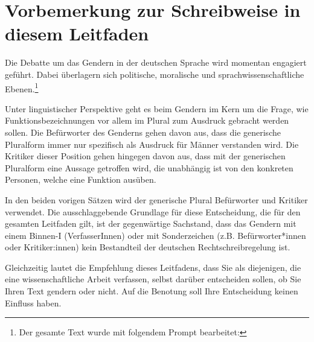 \chapter*{Vorbemerkung zur Schreibweise in diesem Leitfaden}
\label{chap:vorbemerkung}

Die Debatte um das Gendern in der deutschen Sprache wird momentan engagiert geführt. Dabei überlagern sich politische, moralische und sprachwissenschaftliche Ebenen.\footnote{Der gesamte Text wurde mit folgendem Prompt bearbeitet: }

Unter linguistischer Perspektive geht es beim Gendern im Kern um die Frage, wie Funktionsbezeichnungen vor allem im Plural zum Ausdruck gebracht werden sollen. Die Befürworter des Genderns gehen davon aus, dass die generische Pluralform immer nur spezifisch als Ausdruck für Männer verstanden wird. Die Kritiker dieser Position gehen hingegen davon aus, dass mit der generischen Pluralform eine Aussage getroffen wird, die unabhängig ist von den konkreten Personen, welche eine Funktion ausüben.

In den beiden vorigen Sätzen wird der generische Plural \glqq Befürworter\grqq{} und \glqq Kritiker\grqq{} verwendet. Die ausschlaggebende Grundlage für diese Entscheidung, die für den gesamten Leitfaden gilt, ist der gegenwärtige Sachstand, dass das Gendern mit einem Binnen-I (\glqq VerfasserInnen\grqq{}) oder mit Sonderzeichen (z.B. \glqq Befürworter*innen\grqq{} oder \glqq Kritiker:innen\grqq{}) kein Bestandteil der deutschen Rechtschreibregelung ist.

Gleichzeitig lautet die Empfehlung dieses Leitfadens, dass Sie als diejenigen, die eine wissenschaftliche Arbeit verfassen, selbst darüber entscheiden sollen, ob Sie Ihren Text gendern oder nicht. Auf die Benotung soll Ihre Entscheidung keinen Einfluss haben.


